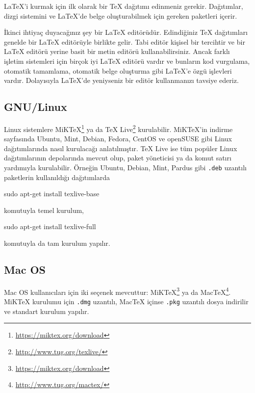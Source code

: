 \documentclass[
  10pt,
]{scrbook}
\newenvironment{Shaded}{}{}
\newcommand{\FunctionTok}[1]{\textcolor[rgb]{0.02,0.16,0.49}{#1}}
\newcommand{\NormalTok}[1]{#1}
\renewcommand{\href}[2]{#2\footnote{\url{#1}}}
\theoremstyle{definition}
\theoremstyle{definition}
\theoremstyle{definition}
\theoremstyle{definition}
\theoremstyle{remark}
\begin{document}
LaTeX'i kurmak için ilk olarak bir TeX dağıtımı edinmeniz gerekir. Dağıtımlar, dizgi sistemini ve LaTeX'de belge oluşturabilmek için gereken paketleri içerir.

İkinci ihtiyaç duyacağınız şey bir LaTeX editörüdür. Edindiğiniz TeX dağıtımları genelde bir LaTeX editörüyle birlikte gelir. Tabi editör kişisel bir tercihtir ve bir LaTeX editörü yerine basit bir metin editörü kullanabilirsiniz. Ancak farklı işletim sistemleri için birçok iyi LaTeX editörü vardır ve bunların kod vurgulama, otomatik tamamlama, otomatik belge oluşturma gibi LaTeX'e özgü işlevleri vardır. Dolayısıyla LaTeX'de yeniyseniz bir editör kullanmanızı tavsiye ederiz.

\hypertarget{gnulinux}{%
\subsection{GNU/Linux}\label{gnulinux}}

Linux sistemlere \href{https://miktex.org/download}{MiKTeX} ya da \href{http://www.tug.org/texlive/}{TeX Live} kurulabilir. MiKTeX'in indirme sayfasında Ubuntu, Mint, Debian, Fedora, CentOS ve openSUSE gibi Linux dağıtımlarında nasıl kurulacağı anlatılmıştır. TeX Live ise tüm popüler Linux dağıtımlarının depolarında mevcut olup, paket yöneticisi ya da komut satırı yardımıyla kurulabilir. Örneğin Ubuntu, Debian, Mint, Pardus gibi \texttt{.deb} uzantılı paketlerin kullanıldığı dağıtımlarda

\begin{Shaded}
\begin{Highlighting}[]
\FunctionTok{sudo}\NormalTok{ apt{-}get install texlive{-}base}
\end{Highlighting}
\end{Shaded}

komutuyla temel kurulum,

\begin{Shaded}
\begin{Highlighting}[]
\FunctionTok{sudo}\NormalTok{ apt{-}get install texlive{-}full}
\end{Highlighting}
\end{Shaded}

komutuyla da tam kurulum yapılır.

\hypertarget{mac-os}{%
\subsection{Mac OS}\label{mac-os}}

Mac OS kullanıcıları için iki seçenek mevcuttur: \href{https://miktex.org/download}{MiKTeX} ya da \href{http://www.tug.org/mactex/}{MacTeX}. MiKTeX kurulumu için \texttt{.dmg} uzantılı, MacTeX içinse \texttt{.pkg} uzantılı dosya indirilir ve standart kurulum yapılır.
\end{document}
